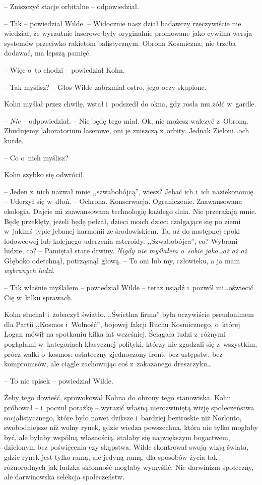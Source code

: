\documentclass[oneside,polish,11pt,sfheadings]{mwbk}
\begin{document}
-- Zniszczyć stacje orbitalne -- odpowiedział.

-- Tak -- powiedział Wilde. -- Widocznie nasz dział badawczy rzeczywiście
nie wiedział, że wyrzutnie laserowe były oryginalnie promowane jako
cywilna wersja systemów przeciwko rakietom balistycznym. Obrona
Kosmiczna, nie trzeba dodawać, ma lepszą pamięć.

-- Więc o~to chodzi -- powiedział Kohn.

-- Tak myślisz? -- Głos Wilde zabrzmiał ostro, jego oczy skupione.

Kohn myślał przez chwilę, wstał i~podszedł do okna, gdy rosła mu żółć w~gardle.

-- \emph{Nie} -- odpowiedział. -- Nie będę tego miał. Ok, nie możesz
walczyć z~Obroną. Zbudujemy laboratorium laserowe, oni je zniszczą z~orbity. Jednak Zieloni\ldots och kurde.

-- Co o~nich myślisz?

Kohn szybko się odwrócił. 

-- Jeden z~nich nazwał mnie ,,szwabobójcą'',
wiesz? Jebać ich i~ich naziekonomię. -- Uderzył się w~dłoń. -- Ochrona.
Konserwacja. Ograniczenie. Zaawansowana ekologia. Dajcie mi zaawansowana
technologię każdego dnia. Nie przerażają mnie. Będę przeklęty, jeżeli
będę pełzał, dzieci moich dzieci czołgające się po ziemi w~jakimś typie
jebanej harmonii ze środowiskiem. Ta, aż do następnej epoki lodowcowej
lub kolejnego uderzenia asteroidy. ,,Szwabobójca'', co? Wybrani ludzie,
co? -- Pamiętał stare drwiny. \emph{Nigdy nie myślałem o~sobie jako\ldots aż
aż aż} Głęboko odetchnął, potrząsnął głową. -- To oni lub my, człowieku,
a ja mam \emph{wybranych ludzi}.

-- Tak właśnie myślałem -- powiedział Wilde -- teraz usiądź i~pozwól
mi\ldots oświecić Cię w~kilku sprawach.

Kohn słuchał i~zobaczył światło. ,,Świetlna firma'' była oczywiście
pseudonimem dla Partii ,,Kosmos i~Wolność'', bojowej fakcji Ruchu
Kosmicznego, o~której Logan mówił na spotkaniu kilka lat wcześniej.
Ściągała ludzi z~różnymi poglądami w~kategoriach klasycznej polityki,
którzy nie zgadzali się z~wszystkim, prócz walki o~kosmos: ostateczny
zjednoczony front, bez ustępstw, bez kompromisów, ale ciągle zachowując
coś z~zakazanego dreszczyku\ldots

-- To nie spisek -- powiedział Wilde.

Żeby tego dowieść, sprowokował Kohna do obrony tego stanowiska. Kohn
próbował -- i~poczuł porażkę -- wyrazić własną nierozwiniętą wizję
społeczeństwa socjalistycznego, które było nawet dziksze i~bardziej
beztroskie niż Norlonto, swobodniejsze niż wolny rynek, gdzie wiedza
powszechna, która nie tylko mogłaby być, ale byłaby wspólną własnością,
stałaby się największym bogactwem, dzielonym bez poświęcenia czy
skąpstwa. Wilde skontrował swoją wizją świata, gdzie rynek jest tylko
ramą, ale jedyną ramą, dla sposobów życia tak różnorodnych jak ludzka
skłonność mogłaby wymyślić. Nie darwinizm społeczny, ale darwinowska
selekcja społeczeństw.
\end{document}
